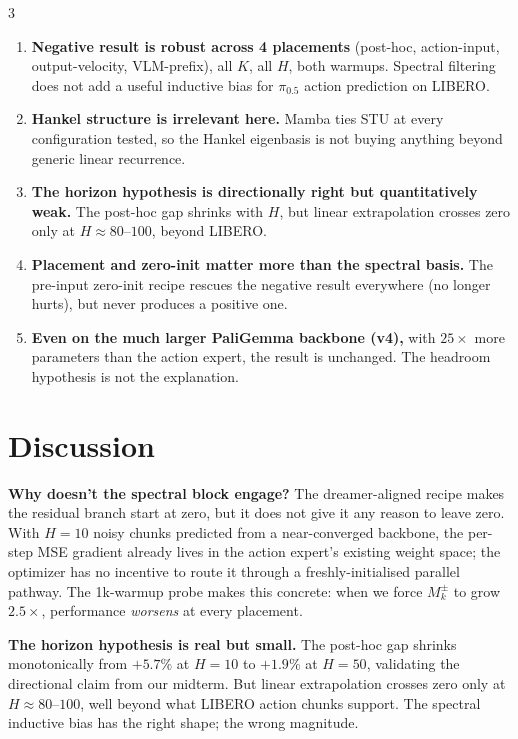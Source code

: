 \documentclass[landscape]{article}
\begin{document}
\begin{multicols}{3}
\colorbox{lightcream}{\parbox{\dimexpr\linewidth-2\fboxsep\relax}{%
\begin{enumerate}[leftmargin=1.6em, nosep, label=\textbf{\arabic*.}]
\item \textbf{Negative result is robust across 4 placements} (post-hoc, action-input, output-velocity, VLM-prefix), all $K$, all $H$, both warmups. Spectral filtering does not add a useful inductive bias for $\pi_{0.5}$ action prediction on LIBERO.
\item \textbf{Hankel structure is irrelevant here.} Mamba ties STU at every configuration tested, so the Hankel eigenbasis is not buying anything beyond generic linear recurrence.
\item \textbf{The horizon hypothesis is directionally right but quantitatively weak.} The post-hoc gap shrinks with $H$, but linear extrapolation crosses zero only at $H \approx 80$--$100$, beyond LIBERO.
\item \textbf{Placement and zero-init matter more than the spectral basis.} The pre-input zero-init recipe rescues the negative result everywhere (no longer hurts), but never produces a positive one.
\item \textbf{Even on the much larger PaliGemma backbone (v4),} with $25\times$ more parameters than the action expert, the result is unchanged. The headroom hypothesis is not the explanation.
\end{enumerate}
}}

\section*{Discussion}

\textbf{Why doesn't the spectral block engage?} The dreamer-aligned recipe makes the residual branch start at zero, but it does not give it any reason to leave zero. With $H{=}10$ noisy chunks predicted from a near-converged backbone, the per-step MSE gradient already lives in the action expert's existing weight space; the optimizer has no incentive to route it through a freshly-initialised parallel pathway. The 1k-warmup probe makes this concrete: when we force $M_k^\pm$ to grow $2.5\times$, performance \emph{worsens} at every placement.

\textbf{The horizon hypothesis is real but small.} The post-hoc gap shrinks monotonically from $+5.7\%$ at $H{=}10$ to $+1.9\%$ at $H{=}50$, validating the directional claim from our midterm. But linear extrapolation crosses zero only at $H \approx 80$--$100$, well beyond what LIBERO action chunks support. The spectral inductive bias has the right shape; the wrong magnitude.


\end{multicols}
\end{document}
